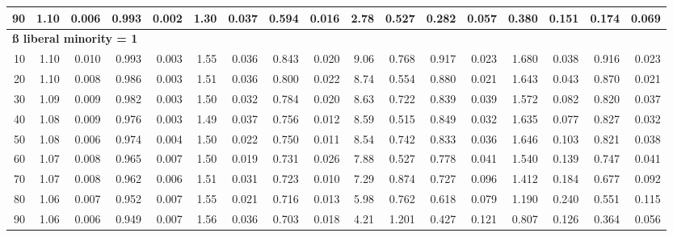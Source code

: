 \documentclass[
]{article}
\begin{document}
\begin{table}[H]
{\begin{tabular}{r|r|r|r|r|r|r|r|r|r|r|r|r|r|r|r|r}
\hline
\hspace{1em}90 & 1.10 & 0.006 & 0.993 & 0.002 & 1.30 & 0.037 & 0.594 & 0.016 & 2.78 & 0.527 & 0.282 & 0.057 & 0.380 & 0.151 & 0.174 & 0.069\\
\hline
\multicolumn{17}{l}{\textbf{ß liberal minority = 1}}\\
\hline
\hspace{1em}10 & 1.10 & 0.010 & 0.993 & 0.003 & 1.55 & 0.036 & 0.843 & 0.020 & 9.06 & 0.768 & 0.917 & 0.023 & 1.680 & 0.038 & 0.916 & 0.023\\
\hline
\hspace{1em}20 & 1.10 & 0.008 & 0.986 & 0.003 & 1.51 & 0.036 & 0.800 & 0.022 & 8.74 & 0.554 & 0.880 & 0.021 & 1.643 & 0.043 & 0.870 & 0.021\\
\hline
\hspace{1em}30 & 1.09 & 0.009 & 0.982 & 0.003 & 1.50 & 0.032 & 0.784 & 0.020 & 8.63 & 0.722 & 0.839 & 0.039 & 1.572 & 0.082 & 0.820 & 0.037\\
\hline
\hspace{1em}40 & 1.08 & 0.009 & 0.976 & 0.003 & 1.49 & 0.037 & 0.756 & 0.012 & 8.59 & 0.515 & 0.849 & 0.032 & 1.635 & 0.077 & 0.827 & 0.032\\
\hline
\hspace{1em}50 & 1.08 & 0.006 & 0.974 & 0.004 & 1.50 & 0.022 & 0.750 & 0.011 & 8.54 & 0.742 & 0.833 & 0.036 & 1.646 & 0.103 & 0.821 & 0.038\\
\hline
\hspace{1em}60 & 1.07 & 0.008 & 0.965 & 0.007 & 1.50 & 0.019 & 0.731 & 0.026 & 7.88 & 0.527 & 0.778 & 0.041 & 1.540 & 0.139 & 0.747 & 0.041\\
\hline
\hspace{1em}70 & 1.07 & 0.008 & 0.962 & 0.006 & 1.51 & 0.031 & 0.723 & 0.010 & 7.29 & 0.874 & 0.727 & 0.096 & 1.412 & 0.184 & 0.677 & 0.092\\
\hline
\hspace{1em}80 & 1.06 & 0.007 & 0.952 & 0.007 & 1.55 & 0.021 & 0.716 & 0.013 & 5.98 & 0.762 & 0.618 & 0.079 & 1.190 & 0.240 & 0.551 & 0.115\\
\hline
\hspace{1em}90 & 1.06 & 0.006 & 0.949 & 0.007 & 1.56 & 0.036 & 0.703 & 0.018 & 4.21 & 1.201 & 0.427 & 0.121 & 0.807 & 0.126 & 0.364 & 0.056\\
\hline
\end{tabular}}\begin{table}
\centering
{}
\end{table}
\end{table}
\end{document}
